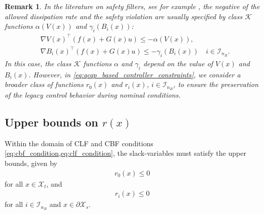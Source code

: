 \documentclass[lettersize,journal]{IEEEtran}
\newtheorem{remark}{Remark}
\newcommand{\afterReviewChangedBox}[1]{{\color{orange}#1}}
\begin{document}
\begin{remark}
   \textit{
      In the literature on safety filters, see for example \cite{AmesCoogan:19}, the negative of the allowed dissipation rate and the safety violation are usually specified by class $\mathcal K$ functions $\alpha(V(x))$ and $\gamma_i(B_i(x))$:
      \begin{subequations}
         \begin{align}
            &\nabla V(x)^\top (f(x) + G(x) u) \leq -\alpha(V(x)), \\
            &\nabla B_i(x)^\top (f(x) + G(x) u) \leq -\gamma_i(B_i(x)) \quad i \in \mathcal I_{n_{\!B}}.
         \end{align}
      \end{subequations}
      In this case, the class $\mathcal K$ functions $\alpha$ and $\gamma_i$ depend on the value of $V(x)$ and $B_i(x)$.
      However, in \cref{eq:qcqp_based_controller_constraints}, we consider a broader class of functions $r_0(x)$ and $r_i(x)$, $i \in \mathcal I_{n_{\!B}}$, \afterReviewChangedBox{to ensure the preservation of the legacy control behavior during nominal conditions.}
   }
\end{remark}

\subsection{Upper bounds on $r(x)$}

\afterReviewChangedBox{Within the domain of CLF and CBF conditions \cref{eq:cbf_condition,eq:clf_condition}, the slack-variables must satisfy the upper bounds, given by
\begin{align} \label{eq:r0_upper_bound}
   r_0(x) \leq 0
\end{align}
for all $x \in \mathcal X_t$, and
\begin{align} \label{eq:ri_upper_bound}
   r_i(x) \leq 0
\end{align}
for all $i \in \mathcal I_{n_{\!B}}$ and $x \in \partial \mathcal X_s$.}
\end{document}
